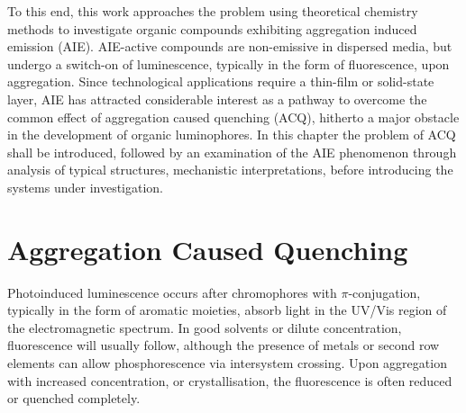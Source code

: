 To this end, this work approaches the problem using theoretical chemistry methods to investigate organic compounds exhibiting aggregation induced emission (AIE). AIE-active compounds are non-emissive in dispersed media, but undergo a switch-on of luminescence, typically in the form of fluorescence, upon aggregation. Since technological applications require a thin-film or solid-state layer, AIE has attracted considerable interest as a pathway to overcome the common effect of aggregation caused quenching (ACQ), hitherto a major obstacle in the development of organic luminophores. In this chapter the problem of ACQ shall be introduced, followed by an examination of the AIE phenomenon through analysis of typical structures, mechanistic interpretations, before introducing the systems under investigation.
\section{Aggregation Caused Quenching}\label{section: lom ACQ}
Photoinduced luminescence occurs after chromophores with $\pi$-conjugation, typically in the form of aromatic moieties, absorb light in the UV/Vis region of the electromagnetic spectrum. In good solvents or dilute concentration, fluorescence will usually follow, although the presence of metals or second row elements can allow phosphorescence via intersystem crossing. Upon aggregation with increased concentration, or crystallisation, the fluorescence is often reduced or quenched completely. 

